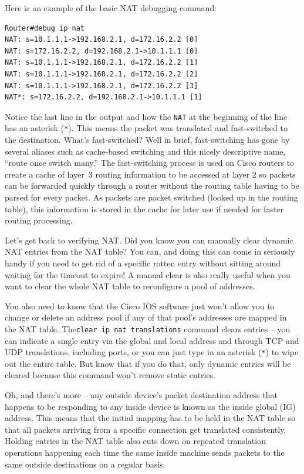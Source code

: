 \documentclass[b5paper,11pt]{memoir}
\begin{document}
Here is an example of
the basic NAT debugging command:

\begin{verbatim}
Router#debug ip nat
NAT: s=10.1.1.1->192.168.2.1, d=172.16.2.2 [0]
NAT: s=172.16.2.2, d=192.168.2.1->10.1.1.1 [0]
NAT: s=10.1.1.1->192.168.2.1, d=172.16.2.2 [1]
NAT: s=10.1.1.1->192.168.2.1, d=172.16.2.2 [2]
NAT: s=10.1.1.1->192.168.2.1, d=172.16.2.2 [3]
NAT*: s=172.16.2.2, d=192.168.2.1->10.1.1.1 [1]
\end{verbatim}

Notice the last line in the output and how the \texttt{NAT} at the
beginning of the line has an asterisk (\texttt{*}). This means the
packet was translated and fast-switched to the destination. What's
fast-switched? Well in brief, fast-switching has gone by several aliases
such as cache-based switching and this nicely descriptive name, ``route
once switch many.'' The fast-switching process is used on Cisco routers
to create a cache of layer~3 routing information to be accessed at layer
2 so packets can be forwarded quickly through a router without the
routing table having to be parsed for every packet. As packets are
packet switched (looked up in the routing table), this information is
stored in the cache for later use if needed for faster routing
processing.

Let's get back to verifying NAT. Did you know you can manually clear
dynamic NAT entries from the NAT table? You can, and doing this can come
in seriously handy if you need to get rid of a specific rotten entry
without sitting around waiting for the timeout to expire! A manual clear
is also really useful when you want to clear the whole NAT table to
reconfigure a pool of addresses.

You also need to know that the Cisco IOS software just won't allow you
to change or delete an address pool if any of that pool's addresses are
mapped in the NAT table. The\texttt{clear\ ip\ nat\ translations}
command clears entries -- you can indicate a single entry via the global
and local address and through TCP and UDP translations, including ports,
or you can just type in an asterisk (\texttt{*}) to wipe out the entire
table. But know that if you do that, only dynamic entries will be
cleared because this command won't remove static entries.

Oh, and there's more -- any outside device's packet destination address
that happens to be responding to any inside device is known as the
inside global (IG) address. This means that the initial mapping has to
be held in the NAT table so that all packets arriving from a specific
connection get translated consistently. Holding entries in the NAT table
also cuts down on repeated translation operations happening each time
the same inside machine sends packets to the same outside destinations
on a regular basis.
\end{document}
